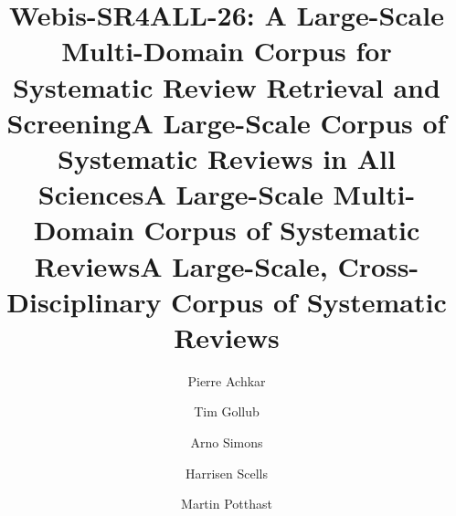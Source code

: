 \title{Webis-SR4ALL-26: A Large-Scale Multi-Domain Corpus for Systematic Review Retrieval and Screening}
\title{A Large-Scale Corpus of Systematic Reviews in All Sciences}
\title{A Large-Scale Multi-Domain Corpus of Systematic Reviews}
\title{A Large-Scale, Cross-Disciplinary Corpus of Systematic Reviews}



\author{Pierre Achkar}

\author{Tim Gollub}

\author{Arno Simons}

\author{Harrisen Scells}

\author{Martin Potthast}

